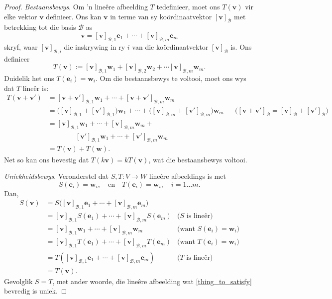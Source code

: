 \documentclass[a4paper,11pt]{book}
\theoremstyle{definition}
\newcommand{\be}{\begin{equation}}
\newcommand{\ee}{\end{equation}}
\newcommand{\ve}[1]{\mathbf{#1}}
\newcommand{\basis}[1]{{\mathcal #1}}
\begin{document}
\begin{proof} \emph{Bestaansbewys}. Om 'n line{\^e}re afbeelding $T$
	tedefinieer, moet ons $T(\ve{v})$ vir elke vektor $\ve{v}$ definieer.
	Ons kan $\ve{v}$ in terme van sy ko{\"o}rdinaatvektor
	$[\ve{v}]_\basis{B}$ met betrekking tot die basis $\basis{B}$ as
	\be \label{expansion_of_v_in_coords}
		\ve{v} = [\ve{v}]_{\basis{B}, 1} \ve{e}_1 + \cdots +
		[\ve{v}]_{\basis{B}, m} \ve{e}_m
	\ee
	skryf, waar $[\ve{v}]_{\basis{B}, i}$ die inskrywing in ry $i$ van die
	ko{\"o}rdinaatvektor $[\ve{v}]_\basis{B}$ is. Ons definieer
	\be \label{formula_for_T}
		T(\ve{v}) := [\ve{v}]_{\basis{B}, 1} \ve{w}_1 +
		[\ve{v}]_{\basis{B}, 2}
		\ve{w}_2 + \cdots [\ve{v}]_{\basis{B}, m} \ve{w}_m.
	\ee
	Duidelik het ons $T(\ve{e}_i) = \ve{w}_i$. Om die bestaansbewys te
	voltooi, moet ons wys dat $T$ line{\^e}r is:
	\begin{align*}
		T(\ve{v} + \ve{v}') &= [\ve{v} + \ve{v}']_{\basis{B},1} \ve{w}_1 +
		\cdots + [\ve{v} + \ve{v}']_{\basis{B}, m} \ve{w}_m \\
		&= \big([\ve{v}]_{\basis{B}, 1} + [\ve{v}']_{\basis{B}, 1} \big)
		\ve{w}_1 + \cdots + \big([\ve{v}]_{\basis{B}, m} +
		[\ve{v}']_{\basis{B}, m}\big) \ve{w}_m && \mbox{($[\ve{v} +
		\ve{v}']_\basis{B} = [\ve{v}]_\basis{B} + [\ve{v}']_\basis{B}$)}
		\\
		&=  [\ve{v}]_{\basis{B}, 1} \ve{w}_1 + \cdots +
		[\ve{v}]_{\basis{B}, m} \ve{w}_m   + \\ & \qquad \qquad
		[\ve{v}']_{\basis{B}, 1} \ve{w}_1 + \cdots + [\ve{v}']_{\basis{B},
		m} \ve{w}_m  \\
		&= T(\ve{v}) + T(\ve{w}).
	\end{align*}
	Net so kan ons bevestig dat $T(k \ve{v}) = k T(\ve{v})$, wat die
	bestaansbewys voltooi.

	\noindent \emph{Uniekheidsbewys}. Veronderstel dat $S, T  : V
	\rightarrow W$ line{\^e}re afbeeldings is met
	\be \label{thing_to_satisfy}
		S(\ve{e}_i) = \ve{w}_i, \quad \text{en} \quad T(\ve{e}_i) =
		\ve{w}_i,
		\quad i = 1 \ldots m.
	\ee
	Dan,
	\begin{align*}
		S (\ve{v}) &= S\big([\ve{v}]_{\basis{B}, 1} \ve{e}_1 + \cdots +
		[\ve{v}]_{\basis{B}, m} \ve{e}_m\big) \\
		&= [\ve{v}]_{\basis{B}, 1} S(\ve{e}_1) + \cdots +
		[\ve{v}]_{\basis{B}, m} S(\ve{e}_m) & \mbox{($S$ is line{\^e}r)} \\
		&= [\ve{v}]_{\basis{B}, 1} \ve{w}_1 + \cdots + [\ve{v}]_{\basis{B},
		m} \ve{w}_m & \mbox{(want $S(\ve{e}_i) = \ve{w}_i$)} \\
		&= [\ve{v}]_{\basis{B}, 1} T(\ve{e}_1) + \cdots +
		[\ve{v}]_{\basis{B}, m} T(\ve{e}_m) & \mbox{(want $T(\ve{e}_i) =
		\ve{w}_i$)} \\
		&= T([\ve{v}]_{\basis{B}, 1} \ve{e}_1 +  \cdots +
		[\ve{v}]_{\basis{B}, m} \ve{e}_m) & \mbox{($T$ is line{\^e}r)} \\
		&= T(\ve{v}).  
	\end{align*}
	Gevolglik $S = T$, met ander woorde, die line{\^e}re afbeelding wat
	\eqref{thing_to_satisfy} bevredig is uniek.
\end{proof}
\end{document}
